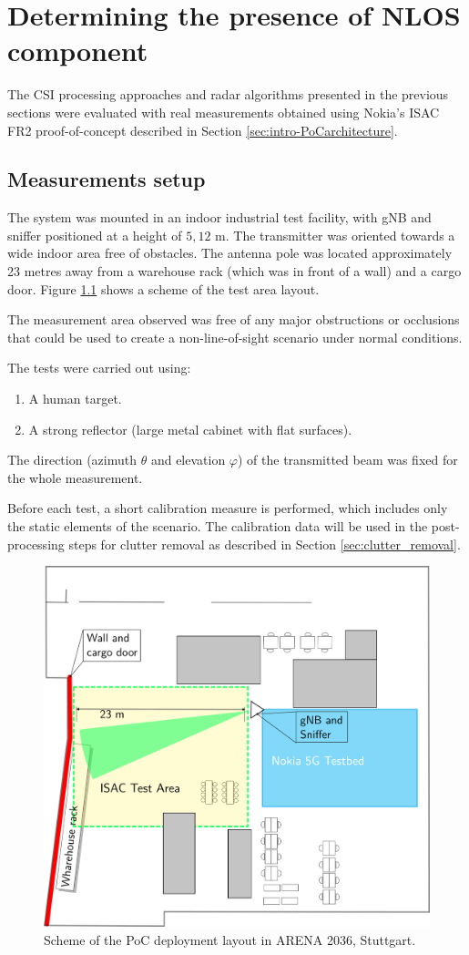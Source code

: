 \chapter{Determining the presence of NLOS component}

The CSI processing approaches and radar algorithms presented in the previous sections were evaluated with real measurements obtained using Nokia's ISAC FR2 proof-of-concept described in Section \ref{sec:intro-PoCarchitecture}.

\section{Measurements setup}
\label{sec:Test1_meas_scenario}

The system was mounted in an indoor industrial test facility, with gNB and sniffer positioned at a height of $5,12$ m. The transmitter was oriented towards a wide  indoor area free of obstacles. The antenna pole was located approximately 23 metres away from a warehouse rack (which was in front of a wall) and a cargo door.
Figure \ref{fig:Test1_arena_plan} shows a scheme of the test area layout.

The measurement area observed was free of any major obstructions or occlusions that could be used to create a non-line-of-sight scenario under normal conditions. 

The tests were carried out using:

\begin{enumerate}
	\item A human target.
	\item A strong reflector (large metal cabinet with flat surfaces).
\end{enumerate}

The direction (azimuth $\theta$ and elevation $\varphi$) of the transmitted beam was fixed for the whole measurement.

Before each test, a short calibration measure is performed, which includes only the static elements of the scenario. The calibration data will be used in the post-processing steps for clutter removal as described in Section \ref{sec:clutter_removal}.

\begin{figure}[H]
	\centering
	\includegraphics[width=.6\textwidth]{Images/Test1/arena_plan}
	\caption{Scheme of the PoC deployment layout in ARENA 2036, Stuttgart.}
	\label{fig:Test1_arena_plan}
\end{figure}


